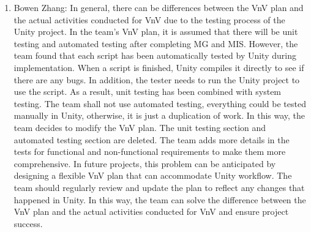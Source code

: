 \documentclass[12pt, titlepage]{article}
\begin{document}
\begin{enumerate}
  \item Bowen Zhang: In general, there can be differences between the VnV plan and the actual activities conducted for VnV due to the testing process of the Unity project. In the team's VnV plan, it is assumed that there will be unit testing and automated testing after completing MG and MIS. However, the team found that each script has been automatically tested by Unity during implementation. When a script is finished, Unity compiles it directly to see if there are any bugs. In addition, the tester needs to run the Unity project to use the script. As a result, unit testing has been combined with system testing. The team shall not use automated testing, everything could be tested manually in Unity, otherwise, it is just a duplication of work. In this way, the team decides to modify the VnV plan. The unit testing section and automated testing section are deleted. The team adds more details in the tests for functional and non-functional requirements to make them more comprehensive. In future projects, this problem can be anticipated by designing a flexible VnV plan that can accommodate Unity workflow. The team should regularly review and update the plan to reflect any changes that happened in Unity. In this way, the team can solve the difference between the VnV plan and the actual activities conducted for VnV and ensure project success.


\end{enumerate}
\end{document}
